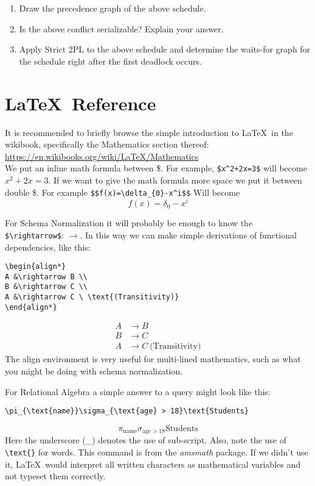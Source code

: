 \documentclass{article}
\begin{document}
\begin{enumerate}
	\item Draw the precedence graph of the above schedule.
	\item Is the above conflict serializable? Explain your answer.
	\item Apply Strict 2PL to the above schedule and determine the waits-for graph for the schedule right after the first deadlock occurs.
\end{enumerate}

\appendix %
\section{\LaTeX\ Reference}
It is recommended to briefly browse the simple introduction to \LaTeX\ in the wikibook, specifically the Mathematics section thereof: \url{https://en.wikibooks.org/wiki/LaTeX/Mathematics} \\

We put an inline math formula between \$. For example, \verb-$x^2+2x=3$- will become $x^2+2x=3$. If we want to give the math formula more space we put it between double \$. For example \verb+$$f(x)=\delta_{0}-x^i$$+ Will become $$f(x)=\delta_{0}-x^i$$

For Schema Normalization it will probably be enough to know the \verb+$\rightarrow$+: $\rightarrow$. In this way we can make simple derivations of functional dependencies, like this:
\begin{verbatim}
\begin{align*} 
A &\rightarrow B \\
B &\rightarrow C \\
A &\rightarrow C \ \text{(Transitivity)}
\end{align*}
\end{verbatim}
\begin{align*} %
A &\rightarrow B \\
B &\rightarrow C \\
A &\rightarrow C \ \text{(Transitivity)}
\end{align*}
The align environment is very useful for multi-lined mathematics, such as what you might be doing with schema normalization.

For Relational Algebra a simple answer to a query might look like this:
\begin{verbatim}
\pi_{\text{name}}\sigma_{\text{age} > 18}\text{Students}
\end{verbatim}
$$
\pi_{\text{name}}\sigma_{\text{age} > 18}\text{Students}
$$
Here the underscore (\_) denotes the use of sub-script.
Also, note the use of \verb+\text{}+ for words. This command is from the \emph{amsmath} package. If we didn't use it, \LaTeX\ would interpret all written characters as mathematical variables and not typeset them correctly.\\
\end{document}
